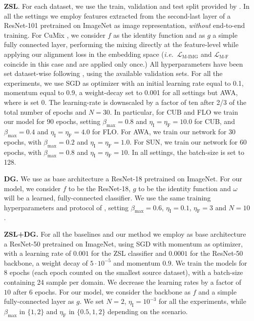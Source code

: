 \documentclass[runningheads]{llncs}
\newcommand{\ie}{\emph{i.e.~}}
\newcommand{\myparagraph}[1]{\noindent\textbf{#1}}
\newcommand{\methodName}{{CuMix} }
\begin{document}
\myparagraph{ZSL}. For each dataset, we use the train, validation and test split provided by \cite{xian2018zeroshotgood}. In all the settings we employ features extracted from the second-last layer of a ResNet-101 \cite{he2016deep} pretrained on ImageNet as image representation, \textit{without} end-to-end training. For \methodName, we consider $f$ as the identity function and as $g$ a simple fully connected layer, performing the mixing directly at the feature-level while applying our alignment loss in the embedding space (\ie $\mathcal{L}_{\text{M-IMG}}$ and $\mathcal{L}_{\text{M-F}}$ coincide in this case and are applied only once.) All hyperparameters have been set dataset-wise following \cite{xian2018zeroshotgood}, using the available validation sets. For all the experiments, we use SGD as optimizer with an initial learning rate equal to 0.1, momentum equal to 0.9, a weight-decay set to 0.001 for all settings but AWA, where is set 0. The learning-rate is downscaled by a factor of ten after 2/3 of the total number of epochs and $N=30$. In particular, for CUB and FLO we train our model for $90$ epochs, setting $\beta_{\text{max}}=0.8$ and $\eta_{\text{I}}=\eta_{\text{F}}=10.0$ for CUB, and $\beta_{\text{max}}=0.4$ and $\eta_{\text{I}}=\eta_{\text{F}}=4.0$ for FLO. For AWA, we train our network for $30$ epochs, with $\beta_{\text{max}}=0.2$ and $\eta_{\text{I}}=\eta_{\text{F}}=1.0$. For SUN, we train our network for $60$ epochs, with $\beta_{\text{max}}=0.8$ and $\eta_{\text{I}}=\eta_{\text{F}}=10$. In all settings, the batch-size is set to 128.

\myparagraph{DG.}  We use as base architecture a ResNet-18 \cite{he2016deep} pretrained on ImageNet. For our model, we consider $f$ to be the ResNet-18, $g$ to be the identity function and $\omega$ will be a learned, fully-connected classifier. We use the same training hyperparameters and protocol of \cite{li2019episodic}, setting $\beta_{\text{max}}=0.6$, $\eta_{\text{I}}=0.1$, $\eta_{\text{F}}=3$ and $N=10$.

\myparagraph{ZSL+DG.} For all the baselines and our method we employ as base architecture a ResNet-50 \cite{he2016deep} pretrained on ImageNet, using SGD with momentum as optimizer, with a learning rate of $0.001$ for the ZSL classifier and $0.0001$ for the ResNet-50 backbone, a weight decay of $5\cdot10^{-5}$ and momentum $0.9$. We train the models for 8 epochs (each epoch counted on the smallest source dataset), with a batch-size containing 24 sample per domain. We decrease the learning rates by a factor of $10$ after 6 epochs. For our model, we consider the backbone as $f$ and a simple fully-connected layer as $g$. We set $N=2$, $\eta_{\text{I}}=10^{-3}$ for all the experiments, while $\beta_{\text{max}}$ in $\{1,2\}$ and $\eta_{\text{F}}$ in $\{0.5,1,2\}$ depending on the scenario.
\end{document}
